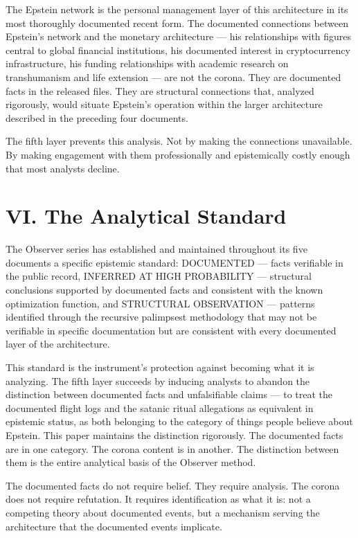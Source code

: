 \documentclass[11pt,a4paper]{article}
\begin{document}
The Epstein network is the personal management layer of this architecture in its most thoroughly documented recent form. The documented connections between Epstein's network and the monetary architecture — his relationships with figures central to global financial institutions, his documented interest in cryptocurrency infrastructure, his funding relationships with academic research on transhumanism and life extension — are not the corona. They are documented facts in the released files. They are structural connections that, analyzed rigorously, would situate Epstein’s operation within the larger architecture described in the preceding four documents.


The fifth layer prevents this analysis. Not by making the connections unavailable. By making engagement with them professionally and epistemically costly enough that most analysts decline.


\section{VI. The Analytical Standard}

The Observer series has established and maintained throughout its five documents a specific epistemic standard: DOCUMENTED — facts verifiable in the public record, INFERRED AT HIGH PROBABILITY — structural conclusions supported by documented facts and consistent with the known optimization function, and STRUCTURAL OBSERVATION — patterns identified through the recursive palimpsest methodology that may not be verifiable in specific documentation but are consistent with every documented layer of the architecture.


This standard is the instrument's protection against becoming what it is analyzing. The fifth layer succeeds by inducing analysts to abandon the distinction between documented facts and unfalsifiable claims — to treat the documented flight logs and the satanic ritual allegations as equivalent in epistemic status, as both belonging to the category of things people believe about Epstein. This paper maintains the distinction rigorously. The documented facts are in one category. The corona content is in another. The distinction between them is the entire analytical basis of the Observer method.


The documented facts do not require belief. They require analysis. The corona does not require refutation. It requires identification as what it is: not a competing theory about documented events, but a mechanism serving the architecture that the documented events implicate.
\end{document}
